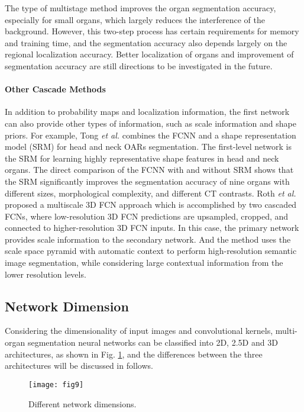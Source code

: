 \documentclass[lettersize,journal]{IEEEtran}
\begin{document}
The type of multistage method improves the organ segmentation accuracy, especially for small organs, which largely reduces the interference of the background. However, this two-step process has certain requirements for memory and training time, and the segmentation accuracy also depends largely on the regional localization accuracy. Better localization of organs and improvement of segmentation accuracy are still directions to be investigated in the future.

\paragraph{	Other Cascade Methods}
In addition to probability maps and localization information, the first network can also provide other types of information, such as scale information and shape priors. For example, Tong {\it{et al.}} \cite{155} combines the FCNN and a shape representation model (SRM) for head and neck OARs segmentation. The first-level network is the SRM for learning highly representative shape features in head and neck organs. The direct comparison of the FCNN with and without SRM shows that the SRM significantly improves the segmentation accuracy of nine organs with different sizes, morphological complexity, and different CT contrasts. Roth {\it{et al.}} \cite{127} proposed a multiscale 3D FCN approach which is accomplished by two cascaded FCNs, where low-resolution 3D FCN predictions are upsampled, cropped, and connected to higher-resolution 3D FCN inputs. In this case, the primary network provides scale information to the secondary network. And the method uses the scale space pyramid with automatic context to perform high-resolution semantic image segmentation, while considering large contextual information from the lower resolution levels.

\subsection{Network Dimension}
\label{sec4_2}
Considering the dimensionality of input images and convolutional kernels, multi-organ segmentation neural networks can be classified into 2D, 2.5D and 3D architectures, as shown in Fig. \ref{fig9}, and the differences between the three architectures will be discussed in follows.
\begin{figure}[ht!]
    \centering
    \texttt{[image: fig9]}
    \caption{Different network dimensions.}
    \label{fig9}
\end{figure}
\end{document}
